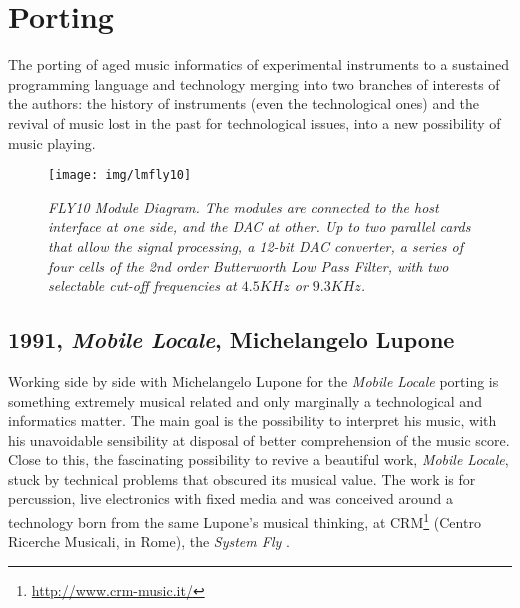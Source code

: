 \documentclass[twoside,a4paper]{article}
\begin{document}


\section{Porting}
\label{sec:porting}

The porting of aged music informatics of experimental instruments to a sustained
programming language and technology merging into two branches of interests of the
authors: the history of instruments (even the technological ones) and the revival
of music lost in the past for technological issues, into a new possibility of
music playing.

\begin{figure}[ht]
\centerline{\texttt{[image: img/lmfly10]}}
\caption{\label{ml-fly10}{\it \emph{FLY10} Module Diagram. The modules are
connected to the host interface at one side, and the DAC at other. Up to two
parallel cards that allow the signal processing, a 12-bit DAC converter, a series
of four cells of the 2nd order Butterworth Low Pass Filter, with two selectable
cut-off frequencies at $4.5KHz$ or $9.3KHz$.
}}
\end{figure}

\subsection{1991, \emph{Mobile Locale}, Michelangelo Lupone}

Working side by side with Michelangelo Lupone for the \emph{Mobile Locale}
\cite{lmml91} porting is something extremely musical related and only marginally
a technological and informatics matter. The main goal is the possibility to
interpret his music, with his unavoidable sensibility at disposal of better
comprehension of the music score. Close to this, the fascinating possibility to
revive a beautiful work, \emph{Mobile Locale}, stuck by technical problems that
obscured its musical value. The work is for percussion, live electronics with
fixed media and was conceived around a technology born from the same Lupone's
musical thinking, at CRM\footnote{\url{http://www.crm-music.it/}}
(Centro Ricerche Musicali, in Rome), the \emph{System Fly} \cite{ml85}.
\end{document}
